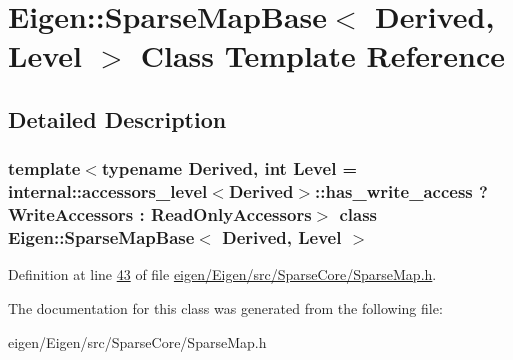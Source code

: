 \hypertarget{class_eigen_1_1_sparse_map_base}{}\section{Eigen\+:\+:Sparse\+Map\+Base$<$ Derived, Level $>$ Class Template Reference}
\label{class_eigen_1_1_sparse_map_base}


\subsection{Detailed Description}
\subsubsection*{template$<$typename Derived, int Level = internal\+::accessors\+\_\+level$<$\+Derived$>$\+::has\+\_\+write\+\_\+access ? Write\+Accessors \+: Read\+Only\+Accessors$>$\newline
class Eigen\+::\+Sparse\+Map\+Base$<$ Derived, Level $>$}



Definition at line \hyperlink{eigen_2_eigen_2src_2_sparse_core_2_sparse_map_8h_source_l00043}{43} of file \hyperlink{eigen_2_eigen_2src_2_sparse_core_2_sparse_map_8h_source}{eigen/\+Eigen/src/\+Sparse\+Core/\+Sparse\+Map.\+h}.



The documentation for this class was generated from the following file\+:\begin{DoxyCompactItemize}
\item 
eigen/\+Eigen/src/\+Sparse\+Core/\+Sparse\+Map.\+h\end{DoxyCompactItemize}
